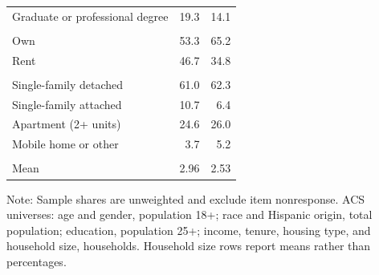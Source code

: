 \begin{table}[pos=H]
\begin{tabular}{lrr}
\quad Graduate or professional degree & 19.3 & 14.1 \\
\addlinespace[2pt]
\multicolumn{3}{l}{\textit{Housing tenure}} \\
\quad Own & 53.3 & 65.2 \\
\quad Rent & 46.7 & 34.8 \\
\addlinespace[2pt]
\multicolumn{3}{l}{\textit{Housing type}} \\
\quad Single-family detached & 61.0 & 62.3 \\
\quad Single-family attached & 10.7 & 6.4 \\
\quad Apartment (2+ units) & 24.6 & 26.0 \\
\quad Mobile home or other & 3.7 & 5.2 \\
\addlinespace[2pt]
\multicolumn{3}{l}{\textit{Household size}} \\
\quad Mean & 2.96 & 2.53 \\
\bottomrule
\end{tabular}
\begin{minipage}{0.8\textwidth}
\vspace{4pt}\footnotesize
Note: Sample shares are unweighted and exclude item nonresponse. ACS universes: age and gender, population 18+; race and Hispanic origin, total population; education, population 25+; income, tenure, housing type, and household size, households. Household size rows report means rather than percentages.
\end{minipage}
\end{table}

